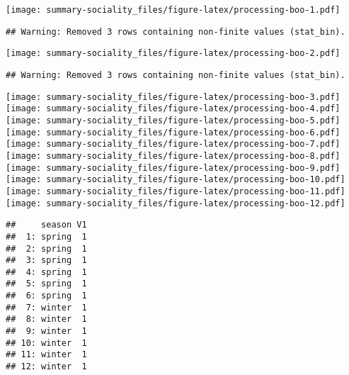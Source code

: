 \documentclass[]{article}
\begin{document}
\texttt{[image: summary-sociality\_files/figure-latex/processing-boo-1.pdf]}

\begin{verbatim}
## Warning: Removed 3 rows containing non-finite values (stat_bin).
\end{verbatim}

\texttt{[image: summary-sociality\_files/figure-latex/processing-boo-2.pdf]}

\begin{verbatim}
## Warning: Removed 3 rows containing non-finite values (stat_bin).
\end{verbatim}

\texttt{[image: summary-sociality\_files/figure-latex/processing-boo-3.pdf]}
\texttt{[image: summary-sociality\_files/figure-latex/processing-boo-4.pdf]}
\texttt{[image: summary-sociality\_files/figure-latex/processing-boo-5.pdf]}
\texttt{[image: summary-sociality\_files/figure-latex/processing-boo-6.pdf]}
\texttt{[image: summary-sociality\_files/figure-latex/processing-boo-7.pdf]}
\texttt{[image: summary-sociality\_files/figure-latex/processing-boo-8.pdf]}
\texttt{[image: summary-sociality\_files/figure-latex/processing-boo-9.pdf]}
\texttt{[image: summary-sociality\_files/figure-latex/processing-boo-10.pdf]}
\texttt{[image: summary-sociality\_files/figure-latex/processing-boo-11.pdf]}
\texttt{[image: summary-sociality\_files/figure-latex/processing-boo-12.pdf]}

\begin{verbatim}
##     season V1
##  1: spring  1
##  2: spring  1
##  3: spring  1
##  4: spring  1
##  5: spring  1
##  6: spring  1
##  7: winter  1
##  8: winter  1
##  9: winter  1
## 10: winter  1
## 11: winter  1
## 12: winter  1
\end{verbatim}
\end{document}
